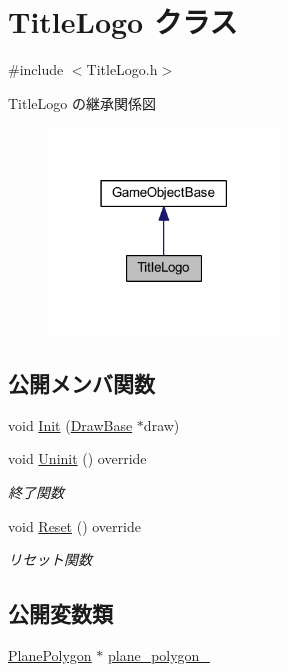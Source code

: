 \hypertarget{class_title_logo}{}\section{Title\+Logo クラス}
\label{class_title_logo}


{\ttfamily \#include $<$Title\+Logo.\+h$>$}



Title\+Logo の継承関係図\nopagebreak
\begin{figure}[H]
\begin{center}
\leavevmode
\includegraphics[width=174pt]{class_title_logo__inherit__graph}
\end{center}
\end{figure}
\subsection*{公開メンバ関数}
\begin{DoxyCompactItemize}
\item 
void \mbox{\hyperlink{class_title_logo_a1e07aae4771bd7a44cb7e3b55b72b9f3}{Init}} (\mbox{\hyperlink{class_draw_base}{Draw\+Base}} $\ast$draw)
\item 
void \mbox{\hyperlink{class_title_logo_a177943b3becc80fcdb7a34f131b07ee9}{Uninit}} () override
\begin{DoxyCompactList}\small\item\em 終了関数 \end{DoxyCompactList}\item 
void \mbox{\hyperlink{class_title_logo_a8bca39d06592b95b26024c2d86ac349c}{Reset}} () override
\begin{DoxyCompactList}\small\item\em リセット関数 \end{DoxyCompactList}\end{DoxyCompactItemize}
\subsection*{公開変数類}
\begin{DoxyCompactItemize}
\item 
\mbox{\hyperlink{class_plane_polygon}{Plane\+Polygon}} $\ast$ \mbox{\hyperlink{class_title_logo_a842ef60ff79632e1dad76599952eb95a}{plane\+\_\+polygon\+\_\+}}
\end{DoxyCompactItemize}
